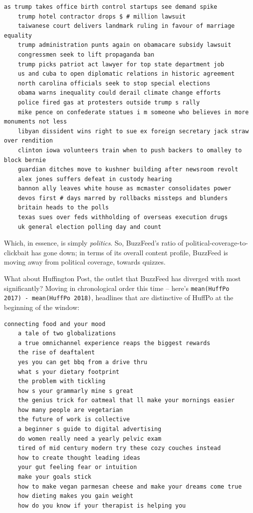 \documentclass{scrartcl}
\begin{document}
\begin{lstlisting}[basicstyle=\tiny\hlfont]
    as trump takes office birth control startups see demand spike
    trump hotel contractor drops $ # million lawsuit
    taiwanese court delivers landmark ruling in favour of marriage equality
    trump administration punts again on obamacare subsidy lawsuit
    congressmen seek to lift propaganda ban
    trump picks patriot act lawyer for top state department job
    us and cuba to open diplomatic relations in historic agreement
    north carolina officials seek to stop special elections
    obama warns inequality could derail climate change efforts
    police fired gas at protesters outside trump s rally
    mike pence on confederate statues i m someone who believes in more monuments not less
    libyan dissident wins right to sue ex foreign secretary jack straw over rendition
    clinton iowa volunteers train when to push backers to omalley to block bernie
    guardian ditches move to kushner building after newsroom revolt
    alex jones suffers defeat in custody hearing
    bannon ally leaves white house as mcmaster consolidates power
    devos first # days marred by rollbacks missteps and blunders
    britain heads to the polls
    texas sues over feds withholding of overseas execution drugs
    uk general election polling day and count
\end{lstlisting}

Which, in essence, is simply \textit{politics}. So, BuzzFeed's ratio of political-coverage-to-clickbait has gone down; in terms of its overall content profile, BuzzFeed is moving away from political coverage, towards quizzes.

What about Huffington Post, the outlet that BuzzFeed has diverged with most significantly? Moving in chronological order this time -- here's \texttt{mean(HuffPo 2017) - mean(HuffPo 2018)}, headlines that are distinctive of HuffPo at the beginning of the window:

\begin{lstlisting}[basicstyle=\tiny\hlfont]
    connecting food and your mood
    a tale of two globalizations
    a true omnichannel experience reaps the biggest rewards
    the rise of deaftalent
    yes you can get bbq from a drive thru
    what s your dietary footprint
    the problem with tickling
    how s your grammarly mine s great
    the genius trick for oatmeal that ll make your mornings easier
    how many people are vegetarian
    the future of work is collective
    a beginner s guide to digital advertising
    do women really need a yearly pelvic exam
    tired of mid century modern try these cozy couches instead
    how to create thought leading ideas
    your gut feeling fear or intuition
    make your goals stick
    how to make vegan parmesan cheese and make your dreams come true
    how dieting makes you gain weight
    how do you know if your therapist is helping you
\end{lstlisting}
\end{document}
